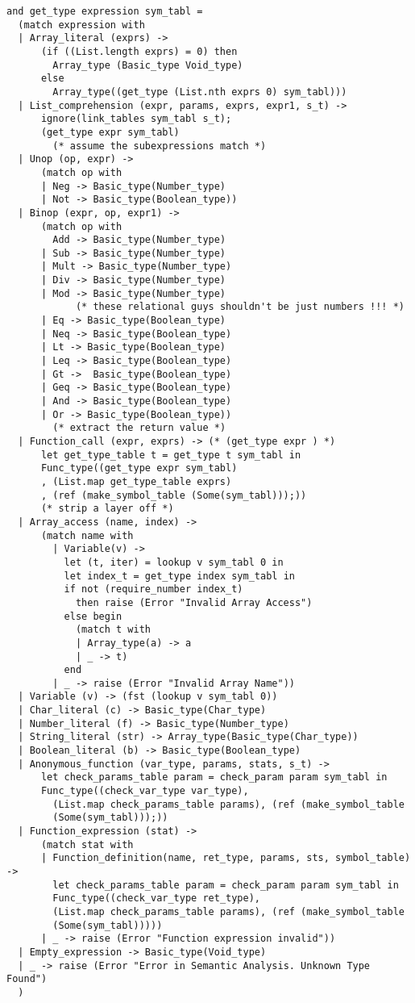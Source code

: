 \begin{verbatim}
and get_type expression sym_tabl =
  (match expression with
  | Array_literal (exprs) ->
      (if ((List.length exprs) = 0) then
        Array_type (Basic_type Void_type)
      else
        Array_type((get_type (List.nth exprs 0) sym_tabl)))
  | List_comprehension (expr, params, exprs, expr1, s_t) ->
      ignore(link_tables sym_tabl s_t);
      (get_type expr sym_tabl)
        (* assume the subexpressions match *)
  | Unop (op, expr) ->
      (match op with
      | Neg -> Basic_type(Number_type)
      | Not -> Basic_type(Boolean_type))
  | Binop (expr, op, expr1) ->
      (match op with
        Add -> Basic_type(Number_type)
      | Sub -> Basic_type(Number_type)
      | Mult -> Basic_type(Number_type)
      | Div -> Basic_type(Number_type)
      | Mod -> Basic_type(Number_type)
            (* these relational guys shouldn't be just numbers !!! *)
      | Eq -> Basic_type(Boolean_type)
      | Neq -> Basic_type(Boolean_type)
      | Lt -> Basic_type(Boolean_type)
      | Leq -> Basic_type(Boolean_type)
      | Gt ->  Basic_type(Boolean_type)
      | Geq -> Basic_type(Boolean_type)
      | And -> Basic_type(Boolean_type)
      | Or -> Basic_type(Boolean_type))
        (* extract the return value *)
  | Function_call (expr, exprs) -> (* (get_type expr ) *)
      let get_type_table t = get_type t sym_tabl in
      Func_type((get_type expr sym_tabl)
      , (List.map get_type_table exprs)
      , (ref (make_symbol_table (Some(sym_tabl)));))
      (* strip a layer off *)
  | Array_access (name, index) ->
      (match name with
        | Variable(v) ->
          let (t, iter) = lookup v sym_tabl 0 in
          let index_t = get_type index sym_tabl in
          if not (require_number index_t)
            then raise (Error "Invalid Array Access")
          else begin
            (match t with
            | Array_type(a) -> a
            | _ -> t)
          end
        | _ -> raise (Error "Invalid Array Name"))
  | Variable (v) -> (fst (lookup v sym_tabl 0))
  | Char_literal (c) -> Basic_type(Char_type)
  | Number_literal (f) -> Basic_type(Number_type)
  | String_literal (str) -> Array_type(Basic_type(Char_type))
  | Boolean_literal (b) -> Basic_type(Boolean_type)
  | Anonymous_function (var_type, params, stats, s_t) ->
      let check_params_table param = check_param param sym_tabl in
      Func_type((check_var_type var_type),
        (List.map check_params_table params), (ref (make_symbol_table
        (Some(sym_tabl)));))
  | Function_expression (stat) ->
      (match stat with
      | Function_definition(name, ret_type, params, sts, symbol_table) ->
        let check_params_table param = check_param param sym_tabl in
        Func_type((check_var_type ret_type),
        (List.map check_params_table params), (ref (make_symbol_table
        (Some(sym_tabl)))))
      | _ -> raise (Error "Function expression invalid"))
  | Empty_expression -> Basic_type(Void_type)
  | _ -> raise (Error "Error in Semantic Analysis. Unknown Type Found")
  )


\end{verbatim}
